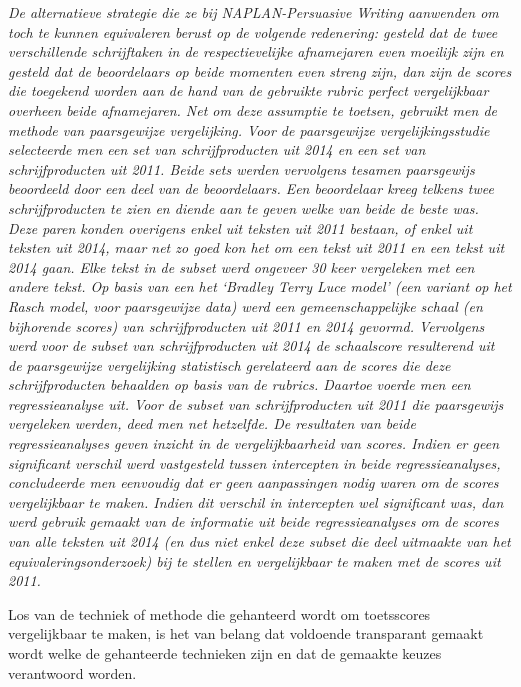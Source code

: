 \documentclass[
  letterpaper,
]{report}
\begin{document}
\emph{De alternatieve strategie die ze bij NAPLAN-Persuasive Writing
aanwenden om toch te kunnen equivaleren berust op de volgende
redenering: gesteld dat de twee verschillende schrijftaken in de
respectievelijke afnamejaren even moeilijk zijn en gesteld dat de
beoordelaars op beide momenten even streng zijn, dan zijn de scores die
toegekend worden aan de hand van de gebruikte rubric perfect
vergelijkbaar overheen beide afnamejaren. Net om deze assumptie te
toetsen, gebruikt men de methode van paarsgewijze vergelijking. Voor de
paarsgewijze vergelijkingsstudie selecteerde men een set van
schrijfproducten uit 2014 en een set van schrijfproducten uit 2011.
Beide sets werden vervolgens tesamen paarsgewijs beoordeeld door een
deel van de beoordelaars. Een beoordelaar kreeg telkens twee
schrijfproducten te zien en diende aan te geven welke van beide de beste
was. Deze paren konden overigens enkel uit teksten uit 2011 bestaan, of
enkel uit teksten uit 2014, maar net zo goed kon het om een tekst uit
2011 en een tekst uit 2014 gaan. Elke tekst in de subset werd ongeveer
30 keer vergeleken met een andere tekst. Op basis van een het `Bradley
Terry Luce model' (een variant op het Rasch model, voor paarsgewijze
data) werd een gemeenschappelijke schaal (en bijhorende scores) van
schrijfproducten uit 2011 en 2014 gevormd. Vervolgens werd voor de
subset van schrijfproducten uit 2014 de schaalscore resulterend uit de
paarsgewijze vergelijking statistisch gerelateerd aan de scores die deze
schrijfproducten behaalden op basis van de rubrics. Daartoe voerde men
een regressieanalyse uit. Voor de subset van schrijfproducten uit 2011
die paarsgewijs vergeleken werden, deed men net hetzelfde. De resultaten
van beide regressieanalyses geven inzicht in de vergelijkbaarheid van
scores. Indien er geen significant verschil werd vastgesteld tussen
intercepten in beide regressieanalyses, concludeerde men eenvoudig dat
er geen aanpassingen nodig waren om de scores vergelijkbaar te maken.
Indien dit verschil in intercepten wel significant was, dan werd gebruik
gemaakt van de informatie uit beide regressieanalyses om de scores van
alle teksten uit 2014 (en dus niet enkel deze subset die deel uitmaakte
van het equivaleringsonderzoek) bij te stellen en vergelijkbaar te maken
met de scores uit 2011.}

Los van de techniek of methode die gehanteerd wordt om toetsscores
vergelijkbaar te maken, is het van belang dat voldoende transparant
gemaakt wordt welke de gehanteerde technieken zijn en dat de gemaakte
keuzes verantwoord worden.
\end{document}
